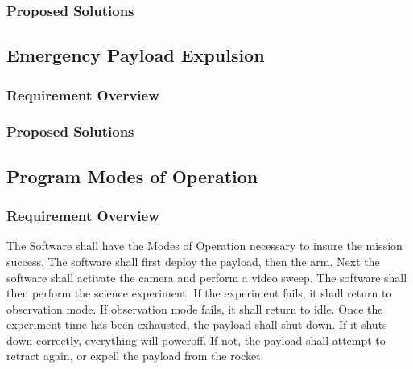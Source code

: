 \documentclass[letterpaper,10pt]{article}
\begin{document}
\subsubsection{Proposed Solutions}

\subsection{Emergency Payload Expulsion}
\subsubsection{Requirement Overview}
\subsubsection{Proposed Solutions}
\subsection{Program Modes of Operation}
\subsubsection{Requirement Overview}
The Software shall have the Modes of Operation necessary to insure the mission success.
The software shall first deploy the payload, then the arm. Next the software shall activate the 
camera and perform a video sweep. The software shall then perform the science experiment.
If the experiment fails, it shall return to observation mode.
If observation mode fails, it shall return to idle.
Once the experiment time has been exhausted, the payload shall shut down.
If it shuts down correctly, everything will poweroff. If not, the payload shall attempt to retract 
again, or expell the payload from the rocket.
\end{document}
